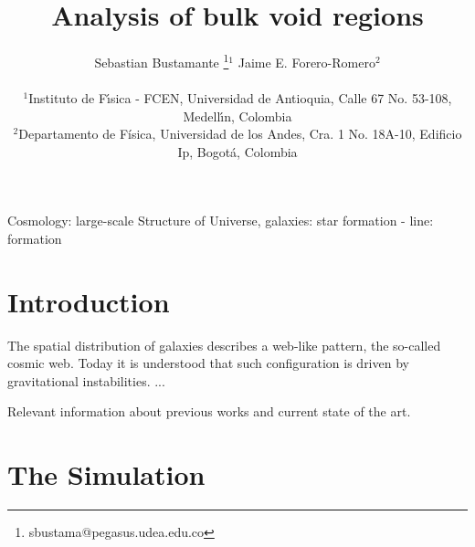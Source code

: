 \documentclass[a4,useAMS,usenatbib,usegraphicx]{latex/mn2e}
\begin{document}
\title{Analysis of bulk void regions}
\author[S. Bustamante and J.E. Forero-Romero]{
\parbox[t]{\textwidth}{\raggedright 
  Sebastian Bustamante \thanks{sbustama@pegasus.udea.edu.co}$^{1}$ 
  Jaime E. Forero-Romero$^{2}$ 
}
\vspace*{6pt}\\
$^1$Instituto de F\'{\i}sica - FCEN, Universidad de Antioquia, Calle
67 No. 53-108, Medell\'{\i}n, Colombia\\ 
$^2$Departamento de F\'{i}sica, Universidad de los Andes, Cra. 1
No. 18A-10, Edificio Ip, Bogot\'a, Colombia
}

\maketitle

\begin{abstract}


\end{abstract}

\begin{keywords}
Cosmology: large-scale Structure of Universe, 
galaxies: star formation - line: formation
\end{keywords}



\section{Introduction}
\label{sec:introduction}


The spatial distribution of galaxies describes a web-like pattern, the 
so-called cosmic web. Today it is understood that such configuration is 
driven by gravitational instabilities. ...

Relevant information about previous works and current state of the art.


\section{The Simulation}
\label{sec:the_simulation}
\end{document}
